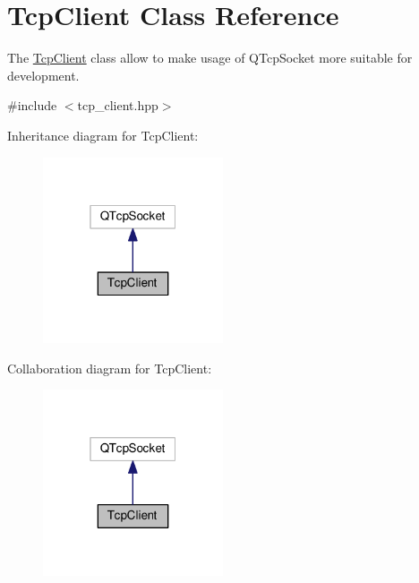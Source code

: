 \hypertarget{class_tcp_client}{}\section{Tcp\+Client Class Reference}
\label{class_tcp_client}


The \hyperlink{class_tcp_client}{Tcp\+Client} class allow to make usage of Q\+Tcp\+Socket more suitable for development.  




{\ttfamily \#include $<$tcp\+\_\+client.\+hpp$>$}



Inheritance diagram for Tcp\+Client\+:
\nopagebreak
\begin{figure}[H]
\begin{center}
\leavevmode
\includegraphics[width=151pt]{class_tcp_client__inherit__graph}
\end{center}
\end{figure}


Collaboration diagram for Tcp\+Client\+:
\nopagebreak
\begin{figure}[H]
\begin{center}
\leavevmode
\includegraphics[width=151pt]{class_tcp_client__coll__graph}
\end{center}
\end{figure}
